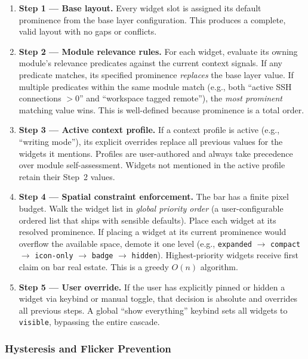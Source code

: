 \documentclass[11pt,a4paper]{article}
\begin{document}
\begin{enumerate}[leftmargin=1.5em, itemsep=4pt]
  \item \textbf{Step 1 --- Base layout.} Every widget slot is assigned its default prominence from the base layer configuration. This produces a complete, valid layout with no gaps or conflicts.

  \item \textbf{Step 2 --- Module relevance rules.} For each widget, evaluate its owning module's relevance predicates against the current context signals. If any predicate matches, its specified prominence \emph{replaces} the base layer value. If multiple predicates within the same module match (e.g., both ``active SSH connections $> 0$'' and ``workspace tagged remote''), the \emph{most prominent} matching value wins. This is well-defined because prominence is a total order.

  \item \textbf{Step 3 --- Active context profile.} If a context profile is active (e.g., ``writing mode''), its explicit overrides replace all previous values for the widgets it mentions. Profiles are user-authored and always take precedence over module self-assessment. Widgets not mentioned in the active profile retain their Step~2 values.

  \item \textbf{Step 4 --- Spatial constraint enforcement.} The bar has a finite pixel budget. Walk the widget list in \emph{global priority order} (a user-configurable ordered list that ships with sensible defaults). Place each widget at its resolved prominence. If placing a widget at its current prominence would overflow the available space, demote it one level (e.g., \texttt{expanded} $\to$ \texttt{compact} $\to$ \texttt{icon-only} $\to$ \texttt{badge} $\to$ \texttt{hidden}). Highest-priority widgets receive first claim on bar real estate. This is a greedy $O(n)$ algorithm.

  \item \textbf{Step 5 --- User override.} If the user has explicitly pinned or hidden a widget via keybind or manual toggle, that decision is absolute and overrides all previous steps. A global ``show everything'' keybind sets all widgets to \texttt{visible}, bypassing the entire cascade.
\end{enumerate}

\subsubsection{Hysteresis and Flicker Prevention}
\end{document}
